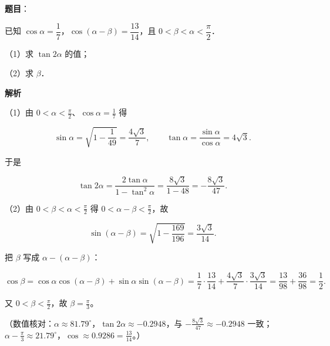 \begin{answer}

\textbf{题目}：

已知 $\cos\alpha=\dfrac17$，$\cos(\alpha-\beta)=\dfrac{13}{14}$，且 $0<\beta<\alpha<\dfrac{\pi}{2}$．

（1）求 $\tan2\alpha$ 的值；

（2）求 $\beta$．

\textbf{解析}

（1）由 $0<\alpha<\frac{\pi}{2}$、$\cos\alpha=\frac17$ 得

\nopagebreak[4]
\[\sin\alpha=\sqrt{1-\frac1{49}}=\frac{4\sqrt3}{7},\qquad \tan\alpha=\frac{\sin\alpha}{\cos\alpha}=4\sqrt3 .\]

于是

\nopagebreak[4]
\[\tan2\alpha=\frac{2\tan\alpha}{1-\tan^2\alpha}=\frac{8\sqrt3}{1-48}=-\frac{8\sqrt3}{47}.\]

（2）由 $0<\beta<\alpha<\frac{\pi}{2}$ 得 $0<\alpha-\beta<\frac{\pi}{2}$，故

\nopagebreak[4]
\[\sin(\alpha-\beta)=\sqrt{1-\frac{169}{196}}=\frac{3\sqrt3}{14}.\]

把 $\beta$ 写成 $\alpha-(\alpha-\beta)$：

\nopagebreak[4]
\[\cos\beta=\cos\alpha\cos(\alpha-\beta)+\sin\alpha\sin(\alpha-\beta)
=\frac17\cdot\frac{13}{14}+\frac{4\sqrt3}{7}\cdot\frac{3\sqrt3}{14}
=\frac{13}{98}+\frac{36}{98}=\frac12 .\]

又 $0<\beta<\frac{\pi}{2}$，故 $\beta=\frac{\pi}{3}$。

（数值核对：$\alpha\approx81.79^\circ$，$\tan2\alpha\approx-0.2948$，与 $-\frac{8\sqrt3}{47}\approx-0.2948$ 一致；$\alpha-\frac{\pi}{3}\approx21.79^\circ$，$\cos\approx0.9286=\frac{13}{14}$。）


\end{answer}
